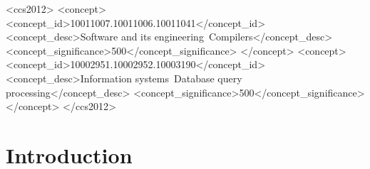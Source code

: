 \documentclass[sigplan,screen,10pt]{acmart}\settopmatter{}
\begin{document}
\begin{abstract}

\end{abstract}


\begin{CCSXML}
<ccs2012>
<concept>
<concept_id>10011007.10011006.10011041</concept_id>
<concept_desc>Software and its engineering~Compilers</concept_desc>
<concept_significance>500</concept_significance>
</concept>
<concept>
<concept_id>10002951.10002952.10003190</concept_id>
<concept_desc>Information systems~Database query processing</concept_desc>
<concept_significance>500</concept_significance>
</concept>
</ccs2012>
\end{CCSXML}





\maketitle

%

\section{Introduction} \label{Sec:introduction}

\end{document}
